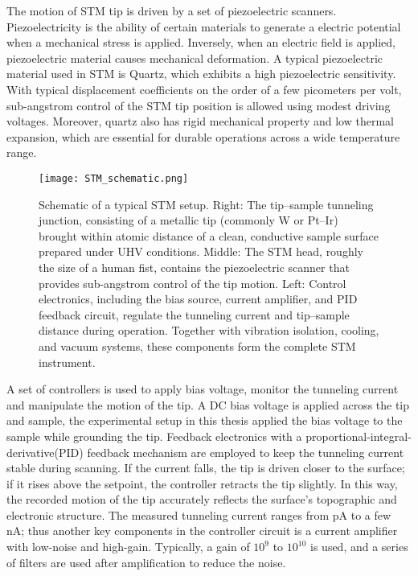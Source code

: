 The motion of STM tip is driven by a set of piezoelectric scanners. Piezoelectricity is the ability of certain materials to generate a electric potential when a mechanical stress is applied. Inversely, when an electric field is applied, piezoelectric material causes mechanical deformation. A typical piezoelectric material used in STM is Quartz, which exhibits a high piezoelectric sensitivity. With typical displacement coefficients on the order of a few picometers per volt, sub-angstrom control of the STM tip position is allowed using modest driving voltages. Moreover, quartz also has rigid mechanical property and low thermal expansion, which are essential for durable operations across a wide temperature range.
 \begin{figure}
 	\centering
 	\texttt{[image: STM\_schematic.png]}
 	\caption{Schematic of a typical STM setup. Right: The tip–sample tunneling junction, consisting of a metallic tip (commonly W or Pt–Ir) brought within atomic distance of a clean, conductive sample surface prepared under UHV conditions. Middle: The STM head, roughly the size of a human fist, contains the piezoelectric scanner that provides sub-angstrom control of the tip motion. Left: Control electronics, including the bias source, current amplifier, and PID feedback circuit, regulate the tunneling current and tip–sample distance during operation. Together with vibration isolation, cooling, and vacuum systems, these components form the complete STM instrument.}
 	\label{fig:stm_schematics}
 \end{figure}
 
A set of controllers is used to apply bias voltage, monitor the tunneling current and manipulate the motion of the tip. A DC bias voltage is applied across the tip and sample, the experimental setup in this thesis applied the bias voltage to the sample while grounding the tip. Feedback electronics with a proportional-integral-derivative(PID) feedback mechanism are employed to keep the tunneling current stable during scanning. If the current falls, the tip is driven closer to the surface; if it rises above the setpoint, the controller retracts the tip slightly. In this way, the recorded motion of the tip accurately reflects the surface's topographic and electronic structure. The measured tunneling current ranges from pA to a few nA; thus another key components in the controller circuit is a current amplifier with low-noise and high-gain. Typically, a gain of $10^9$ to $10^10$ is used, and a series of filters are used after amplification to reduce the noise. 

